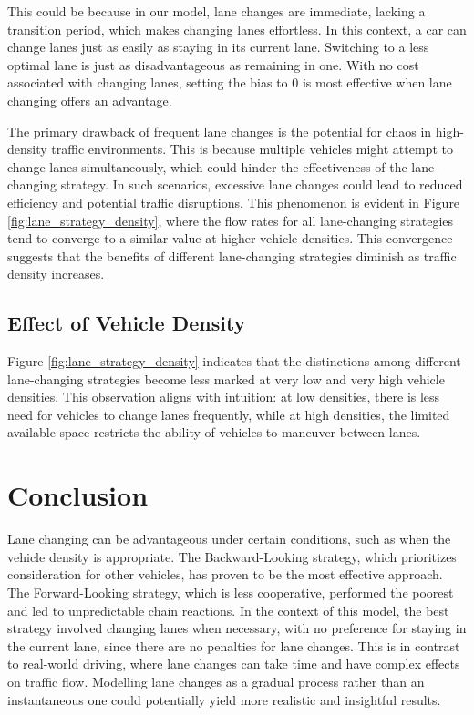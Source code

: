 \documentclass{article}
\begin{document}
This could be because in our model, lane changes are immediate, lacking a transition period, which makes changing lanes effortless. In this context, a car can change lanes just as easily as staying in its current lane. Switching to a less optimal lane is just as disadvantageous as remaining in one. With no cost associated with changing lanes, setting the bias to 0 is most effective when lane changing offers an advantage.

The primary drawback of frequent lane changes is the potential for chaos in high-density traffic environments. This is because multiple vehicles might attempt to change lanes simultaneously, which could hinder the effectiveness of the lane-changing strategy. In such scenarios, excessive lane changes could lead to reduced efficiency and potential traffic disruptions. This phenomenon is evident in Figure \ref{fig:lane_strategy_density}, where the flow rates for all lane-changing strategies tend to converge to a similar value at higher vehicle densities. This convergence suggests that the benefits of different lane-changing strategies diminish as traffic density increases.

\subsection{Effect of Vehicle Density}
Figure \ref{fig:lane_strategy_density} indicates that the distinctions among different lane-changing strategies become less marked at very low and very high vehicle densities. This observation aligns with intuition: at low densities, there is less need for vehicles to change lanes frequently, while at high densities, the limited available space restricts the ability of vehicles to maneuver between lanes.

\newpage
\section{Conclusion}
Lane changing can be advantageous under certain conditions, such as when the vehicle density is appropriate. The Backward-Looking strategy, which prioritizes consideration for other vehicles, has proven to be the most effective approach. The Forward-Looking strategy, which is less cooperative, performed the poorest and led to unpredictable chain reactions.
In the context of this model, the best strategy involved changing lanes when necessary, with no preference for staying in the current lane, since there are no penalties for lane changes. This is in contrast to real-world driving, where lane changes can take time and have complex effects on traffic flow. Modelling lane changes as a gradual process rather than an instantaneous one could potentially yield more realistic and insightful results.
\end{document}
